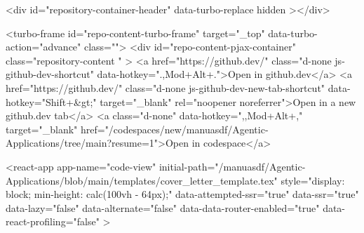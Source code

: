 {{    
  <div id="repository-container-header" data-turbo-replace hidden ></div>



<turbo-frame id="repo-content-turbo-frame" target="_top" data-turbo-action="advance" class="">
    <div id="repo-content-pjax-container" class="repository-content " >
      <a href="https://github.dev/" class="d-none js-github-dev-shortcut" data-hotkey=".,Mod+Alt+.">Open in github.dev</a>
  <a href="https://github.dev/" class="d-none js-github-dev-new-tab-shortcut" data-hotkey="Shift+&gt;" target="_blank" rel="noopener noreferrer">Open in a new github.dev tab</a>
    <a class="d-none" data-hotkey=",,Mod+Alt+," target="_blank" href="/codespaces/new/manuasdf/Agentic-Applications/tree/main?resume=1">Open in codespace</a>




    
      
    








<react-app
  app-name="code-view"
  initial-path="/manuasdf/Agentic-Applications/blob/main/templates/cover_letter_template.tex"
  style="display: block; min-height: calc(100vh - 64px);"
  data-attempted-ssr="true"
  data-ssr="true"
  data-lazy="false"
  data-alternate="false"
  data-data-router-enabled="true"
  data-react-profiling="false"
>
  
}}
